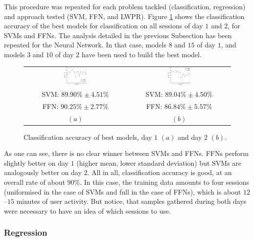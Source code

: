 This procedure was repeated for each problem tackled (classification,
regression) and approach tested (SVM, FFN, and LWPR). Figure
\ref{fig:best_class} shows the classification accuracy of the best
models for classification on all sessions of day $1$ and $2$, for SVMs
and FFNs. The analysis detailed in the previous Subsection has been
repeated for the Neural Network. In that case, models $8$ and $15$ of
day $1$, and models $3$ and $10$ of day $2$ have been used to build
the best model.

\begin{figure}[!ht] \centering
  \begin{tabular}{cc}
    \includegraphics[width=0.23\textwidth]{figs/fig_class_resCrossBestOnDay1.eps} &
    \includegraphics[width=0.23\textwidth]{figs/fig_class_resCrossBestOnDay2.eps} \\
    SVM: $89.90\% \pm 4.51\%$ & SVM: $89.04\% \pm 4.50\%$ \\
    FFN: $90.25\% \pm 2.77\%$ & FFN: $86.84\% \pm 5.57\%$ \\
    $(a)$ & $(b)$ \\
  \end{tabular}
  \caption{Classification accuracy of best models, day $1$ $(a)$ and
    day $2$ $(b)$.}
  \label{fig:best_class}
\end{figure}

As one can see, there is no clear winner between SVMs and FFNs. FFNs
perform slightly better on day $1$ (higher mean, lower standard
deviation) but SVMs are analogously better on day $2$. All in all,
classification accuracy is good, at an overall rate of about
$90\%$. In this case, the training data amounts to four sessions
(uniformised in the case of SVMs and full in the case of FFNs), which
is about $12$--$15$ minutes of user activity. But notice, that samples
gathered during both days were necessary to have an idea of which
sessions to use.

\subsubsection{Regression}


